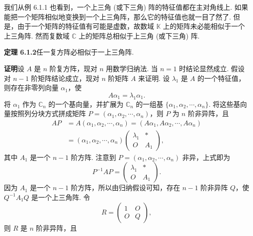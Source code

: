 \documentclass[UTF8, 12pt, fontset=fandol, oneside]{ctexart}
\begin{document}
我们从例 6.1.1 也看到，一个上三角 (或下三角) 阵的特征值都在主对角线上. 如果能把一个矩阵相似地变换到一个上三角阵，那么它的特征值也就一目了然了. 但是，由于一个矩阵的特征值有可能是虚数，故数域 $\mathbb{K}$ 上的矩阵未必能相似于一个上三角阵. 然而复数域 $\mathbb{C}$ 上的矩阵总相似于上三角 (或下三角) 阵.

\noindent\textbf{定理 6.1.2}\quad 任一复方阵必相似于一上三角阵.

\noindent\textbf{证明}\quad 设 $A$ 是 $n$ 阶复方阵，现对 $n$ 用数学归纳法. 当 $n=1$ 时结论显然成立. 假设对 $n-1$ 阶矩阵结论成立，现对 $n$ 阶矩阵 $A$ 来证明. 设 $\lambda_1$ 是 $A$ 的一个特征值，则存在非零列向量 $\alpha_1$，使
\[
A\alpha_1=\lambda_1\alpha_1.
\]
将 $\alpha_1$ 作为 $\mathbb{C}_n$ 的一个基向量，并扩展为 $\mathbb{C}_n$ 的一组基 $\{\alpha_1,\alpha_2,\cdots,\alpha_n\}$. 将这些基向量按照列分块方式拼成矩阵 $P=(\alpha_1,\alpha_2,\cdots,\alpha_n)$，则 $P$ 为 $n$ 阶非异阵，且
\[
\begin{aligned}
AP&=A(\alpha_1,\alpha_2,\cdots,\alpha_n)=(A\alpha_1,A\alpha_2,\cdots,A\alpha_n)\\
&=(\alpha_1,\alpha_2,\cdots,\alpha_n)
\left(\begin{array}{cc}
\lambda_1 & *\\
O & A_1
\end{array}\right),
\end{aligned}
\]
其中 $A_1$ 是一个 $n-1$ 阶方阵. 注意到 $P=(\alpha_1,\alpha_2,\cdots,\alpha_n)$ 非异，上式即为
\[
P^{-1}AP=\left(\begin{array}{cc}
\lambda_1 & *\\
O & A_1
\end{array}\right).
\]
因为 $A_1$ 是一个 $n-1$ 阶方阵，所以由归纳假设可知，存在 $n-1$ 阶非异阵 $Q$，使 $Q^{-1}A_1Q$ 是一个上三角阵. 令
\[
R=\left(\begin{array}{cc}
1 & O\\
O & Q
\end{array}\right),
\]
则 $R$ 是 $n$ 阶非异阵，且
\end{document}
